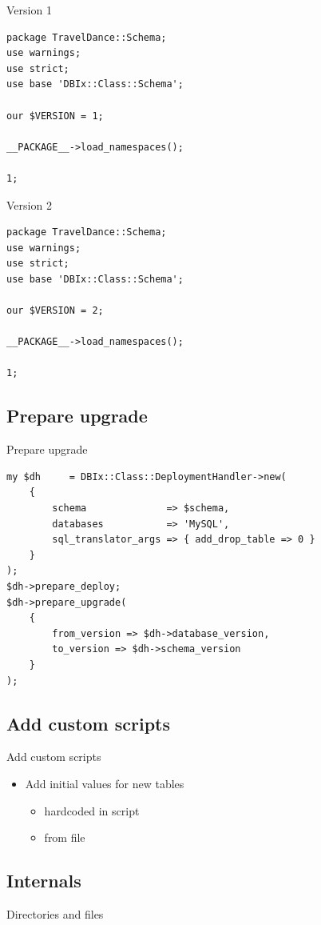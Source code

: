 \begin{frame}[fragile]{Version 1}
\begin{lstlisting}
package TravelDance::Schema;
use warnings;
use strict;
use base 'DBIx::Class::Schema';

our $VERSION = 1;

__PACKAGE__->load_namespaces();

1;
\end{lstlisting}
\end{frame}

\begin{frame}[fragile]{Version 2}
\begin{lstlisting}
package TravelDance::Schema;
use warnings;
use strict;
use base 'DBIx::Class::Schema';

our $VERSION = 2;

__PACKAGE__->load_namespaces();

1;
\end{lstlisting}
\end{frame}

\subsection{Prepare upgrade}

\begin{frame}[fragile]{Prepare upgrade}
\begin{lstlisting}
my $dh     = DBIx::Class::DeploymentHandler->new(
    {
        schema              => $schema,
        databases           => 'MySQL',
        sql_translator_args => { add_drop_table => 0 }
    }
);
$dh->prepare_deploy;
$dh->prepare_upgrade(
    {
        from_version => $dh->database_version,
        to_version => $dh->schema_version
    }
);
\end{lstlisting}
\end{frame}

\subsection{Add custom scripts}

\begin{frame}{Add custom scripts}
\begin{itemize}
\item Add initial values for new tables
\begin{itemize}
\item hardcoded in script
\item from file
\end{itemize}
\end{itemize}
\end{frame}

\subsection{Internals}

\begin{frame}{Directories and files}
\end{frame}



